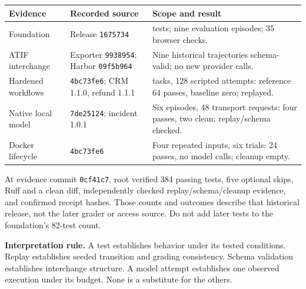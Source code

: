 \documentclass[
  11pt,
  letterpaper,
]{article}
\newcounter{none} %
\begin{document}
{\def\LTcaptype{none} %
\begin{longtable}[]{@{}
  >{\raggedright\arraybackslash}p{}
  >{\raggedright\arraybackslash}p{}
  >{\raggedright\arraybackslash}p{}@{}}
\toprule\noalign{}
\begin{minipage}[b]{\linewidth}\raggedright
Evidence
\end{minipage} & \begin{minipage}[b]{\linewidth}\raggedright
Recorded source
\end{minipage} & \begin{minipage}[b]{\linewidth}\raggedright
Scope and result
\end{minipage} \\
\midrule\noalign{}
\endhead
\bottomrule\noalign{}
\endlastfoot
Foundation & Release \texttt{1675734} & 82 tests; nine evaluation
episodes; 35 browser checks. \\
ATIF interchange & Exporter \texttt{9938954}; Harbor \texttt{09f5b964} &
Nine historical trajectories schema-valid; no new provider calls. \\
Hardened workflows & \texttt{4bc73fe6}; CRM 1.1.0, refund 1.1.1 & 64
tasks, 128 scripted attempts: reference 64 passes, baseline zero;
replayed. \\
Native local model & \texttt{7de25124}; incident 1.0.1 & Six episodes,
48 transport requests: four passes, two clean; replay/schema checked. \\
Docker lifecycle & \texttt{4bc73fe6} & Four repeated inputs, six trials:
24 passes, no model calls; cleanup empty. \\
\end{longtable}
}

At evidence commit \texttt{0cf41c7}, root verified 384 passing tests,
five optional skips, Ruff and a clean diff, independently checked
replay/schema/cleanup evidence, and confirmed receipt hashes. Those
counts and outcomes describe that historical release, not the later
grader or access source. Do not add later tests to the foundation's
82-test count.

\textbf{Interpretation rule.} A test establishes behavior under its
tested conditions. Replay establishes seeded transition and grading
consistency. Schema validation establishes interchange structure. A
model attempt establishes one observed execution under its budget. None
is a substitute for the others.
\end{document}
